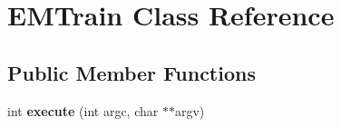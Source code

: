\hypertarget{classEMTrain}{
\section{EMTrain Class Reference}
\label{classEMTrain}
}
\subsection*{Public Member Functions}
\begin{DoxyCompactItemize}
\item 
\hypertarget{classEMTrain_ad3c24cf0f7dc765ac3df0655170b3b63}{
int {\bfseries execute} (int argc, char $\ast$$\ast$argv)}
\label{classEMTrain_ad3c24cf0f7dc765ac3df0655170b3b63}

\end{DoxyCompactItemize}
